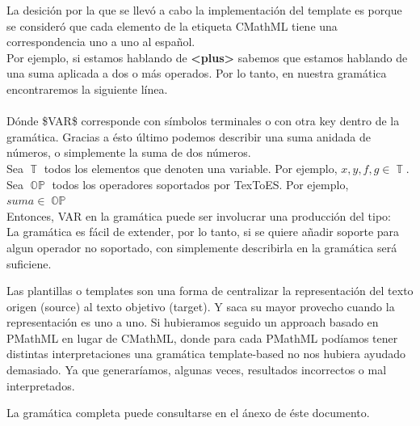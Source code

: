 La desición por la que se llevó a cabo la implementación del template es porque se consideró que cada elemento de la etiqueta CMathML tiene una correspondencia uno a uno al español.\\

Por ejemplo, si estamos hablando de \textbf{<plus>} sabemos que estamos hablando de una suma aplicada a dos o más operados. Por lo tanto, en nuestra gramática encontraremos la siguiente línea.\\

\\

Dónde \$VAR\$ corresponde con símbolos terminales o con otra key dentro de la gramática. Gracias a ésto último podemos describir una suma anidada de números, o simplemente la suma de dos números.\\
Sea $\operatorname{\mathbb{T}}$ todos los elementos que denoten una variable. Por ejemplo, $x,y,f,g \in \operatorname{\mathbb{T}}$.\\
Sea $\operatorname{\mathbb{OP}}$ todos los operadores soportados por TexToES. Por ejemplo, $\textit{suma} \in \operatorname{\mathbb{OP}}$\\

Entonces, VAR en la gramática puede ser involucrar una producción del tipo:
\\

La gramática es fácil de extender, por lo tanto, si se quiere añadir soporte para algun operador no soportado, con simplemente describirla en la gramática será suficiene.

Las plantillas o templates son una forma de centralizar la representación del texto origen (source) al texto objetivo (target). Y saca su mayor provecho cuando la representación es uno a uno. Si hubieramos seguido un approach basado en PMathML en lugar de CMathML, donde para cada PMathML podíamos tener distintas interpretaciones una gramática template-based no nos hubiera ayudado demasiado. Ya que generaríamos, algunas veces, resultados incorrectos o mal interpretados.

La gramática completa puede consultarse en el ánexo de éste documento.